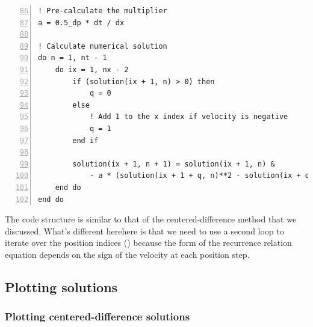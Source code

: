 \noindent\begin{minipage}{\linewidth}
\begin{lstlisting}[caption={Implementation of the upwind method of solving advection equation (\code{advection\_equation.f90}).},frame=tlrb,label={code_upwind}, numbers=left, firstnumber=86]
! Pre-calculate the multiplier
a = 0.5_dp * dt / dx

! Calculate numerical solution
do n = 1, nt - 1
    do ix = 1, nx - 2
        if (solution(ix + 1, n) > 0) then
            q = 0
        else
            ! Add 1 to the x index if velocity is negative
            q = 1
        end if

        solution(ix + 1, n + 1) = solution(ix + 1, n) &
            - a * (solution(ix + 1 + q, n)**2 - solution(ix + q, n)**2)
    end do
end do
\end{lstlisting}
\end{minipage}

The code structure is similar to that of the centered-difference method that we discussed. What's different herehere is that we need to use a second loop to iterate over the position indices () because the form of the recurrence relation equation depends on the sign of the velocity at each position step.


\subsection{Plotting solutions}

\subsubsection{Plotting centered-difference solutions}

